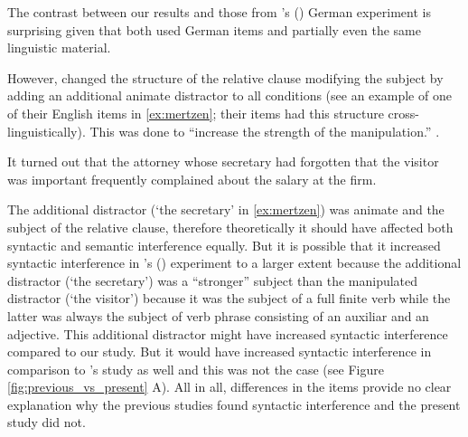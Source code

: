 \documentclass[review,preprint,12pt,authoryear,floatsintext]{elsarticle}
\begin{document}
{The contrast between our results and those from  \citeauthor{mertzen}'s (\citeyear{mertzen}) German experiment is surprising given that both used German items and partially even the same linguistic material. {However, \citet{mertzen} changed the structure of the relative clause modifying the subject by adding an additional animate distractor to all conditions (see an example of one of their English items in \ref{ex:mertzen}; their items had this structure cross-linguistically). This was done to ``increase the strength of the manipulation.'' \citep[][p. 9]{mertzen}. 

\begin{exe}[ht]
\ex \label{ex:mertzen} 
It turned out that the attorney whose secretary had forgotten that the visitor was important frequently complained about the salary at the firm. \citep{mertzen}
\end{exe}
}

The additional distractor (`the secretary' in \ref{ex:mertzen}) was animate and the subject of the relative clause, therefore theoretically it should have affected both syntactic and semantic interference equally. But it is possible that it increased syntactic interference in \citeauthor{mertzen}'s (\citeyear{mertzen}) experiment to a larger extent because the additional distractor (`the secretary') was a ``stronger'' subject than the manipulated distractor (`the visitor') because it was the subject of a full finite verb while the latter was always the subject of verb phrase consisting of an auxiliar and an adjective. This additional distractor might have increased syntactic interference compared to our study. But it would have increased syntactic interference in comparison to \citeauthor{vandyke07}'s study as well and this was not the case (see Figure \ref{fig:previous_vs_present} A).\label{items_mertzen} All in all, differences in the items provide no clear explanation why the previous studies found syntactic interference and the present study did not.

}
\end{document}
